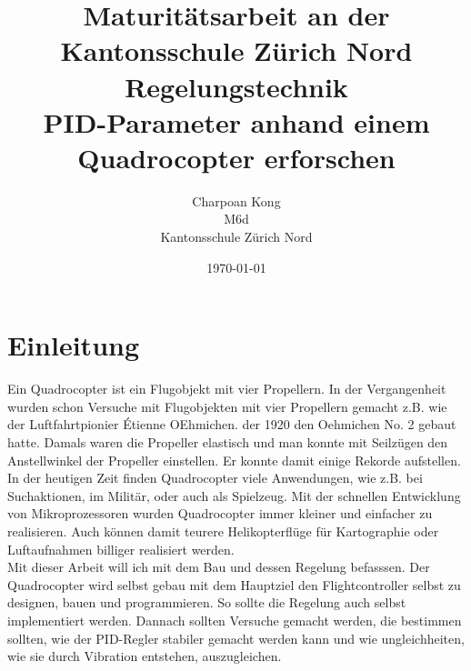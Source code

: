 \documentclass[12pt,a4paper, ngerman]{article}
\begin{document}
\title{\large Maturitätsarbeit an der Kantonsschule Zürich Nord \\ \Huge Regelungstechnik \\ \huge PID-Parameter anhand einem Quadrocopter erforschen}
\date{\today}
\author{Charpoan Kong \\ M6d \\ Kantonsschule Zürich Nord}
\maketitle
{}





\newpage
\clearpage
{}
\tableofcontents
\newpage
{}

\section{Einleitung}
Ein Quadrocopter ist ein Flugobjekt mit vier Propellern. In der Vergangenheit wurden schon Versuche mit Flugobjekten mit vier Propellern gemacht z.B. wie der Luftfahrtpionier Étienne OEhmichen. der 1920 den Oehmichen No. 2 gebaut hatte. Damals waren die Propeller elastisch und man konnte mit Seilzügen den Anstellwinkel der Propeller einstellen. Er konnte damit einige Rekorde aufstellen.\cite{website:Wikipedia_Quadrocopter}\\

In der heutigen Zeit finden Quadrocopter viele Anwendungen, wie z.B. bei Suchaktionen, im Militär, oder auch als Spielzeug. Mit der schnellen Entwicklung von Mikroprozessoren wurden Quadrocopter immer kleiner und einfacher zu realisieren. Auch können damit teurere Helikopterflüge für Kartographie oder Luftaufnahmen billiger realisiert werden.\\

Mit dieser Arbeit will ich mit dem Bau und dessen Regelung befasssen. Der Quadrocopter wird selbst gebau mit dem Hauptziel den Flightcontroller selbst zu designen, bauen und programmieren. So sollte die Regelung auch selbst implementiert werden. Dannach sollten Versuche gemacht werden, die bestimmen sollten, wie der PID-Regler stabiler gemacht werden kann und wie ungleichheiten, wie sie durch Vibration entstehen, auszugleichen.
\newpage
\end{document}
